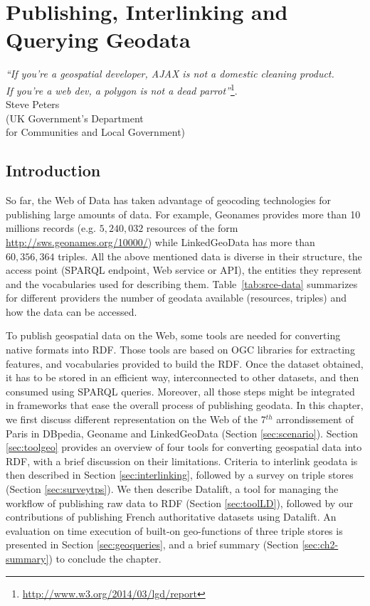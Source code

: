 
\chapter{Publishing, Interlinking and Querying Geodata}
\label{ch:ch2}

\begin{flushright}
\textit{``If you're a geospatial developer, AJAX is not a domestic cleaning product. \\
If you're a web dev, a polygon is not a dead parrot''}\footnote{\url{http://www.w3.org/2014/03/lgd/report}}.\\
Steve Peters \\
(UK Government's Department \\for Communities and Local Government)

\end{flushright}

\section*{Introduction}
\label{sec:intro-ch2}
So far, the Web of Data has taken advantage of geocoding technologies for publishing large amounts of data. For example, Geonames provides more than 10 millions records (e.g. $5,240,032$ resources of the form \url{http://sws.geonames.org/10000/}) while LinkedGeoData has more than $60,356,364$ triples. All the above mentioned data is diverse in their structure, the access point (SPARQL endpoint, Web service or API), the entities they represent and the vocabularies used for describing them. Table~\ref{tab:srce-data} summarizes for different providers the number of geodata available (resources, triples) and how the data can be accessed.


To publish geospatial data on the Web, some tools are needed for converting native formats into RDF. Those tools are based on OGC libraries for extracting features, and vocabularies provided to build the RDF. Once the dataset obtained, it has to be stored in an efficient way, interconnected to other datasets, and then consumed using SPARQL queries. Moreover, all those steps might be integrated in frameworks that ease the overall process of publishing geodata. In this chapter, we first discuss different representation on the Web of the 7$^{th}$ arrondissement of Paris in DBpedia, Geoname and LinkedGeoData (Section \ref{sec:scenario}). Section \ref{sec:toolgeo} provides an overview of four tools for converting geospatial data into RDF, with a brief discussion on their limitations. Criteria to interlink geodata is then described in Section \ref{sec:interlinking}, followed by a survey on triple stores (Section \ref{sec:surveytps}). We then describe Datalift, a tool for managing the workflow of publishing raw data to RDF (Section \ref{sec:toolLD}), followed by our contributions of publishing French authoritative datasets using Datalift. An evaluation on time execution of built-on geo-functions of three triple stores is presented in Section \ref{sec:geoqueries}, and a brief summary (Section \ref{sec:ch2-summary}) to conclude the chapter.

